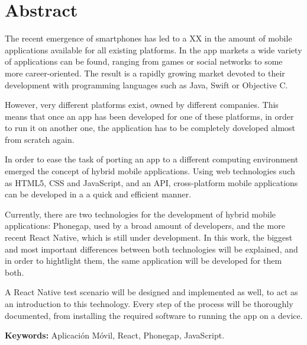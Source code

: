 \chapter*{Abstract}
\justifying


The recent emergence of smartphones has led to a XX in the amount of mobile applications available for all existing platforms. In the app markets a wide variety of applications can be found, ranging from games or social networks to some more career-oriented. The result is a rapidly growing market devoted to their development with programming languages such as Java, Swift or Objective C.

However, very different platforms exist, owned by different companies. This means that once an app has been developed for one of these platforms, in order to run it on another one, the application has to be completely doveloped almost from scratch again.

In order to ease the task of porting an app to a different computing environment emerged the concept of hybrid mobile applications. Using web technologies such as HTML5, CSS and JavaScript, and an API, cross-platform mobile applications can be developed in a a quick and efficient manner.

Currently, there are two technologies for the development of hybrid mobile applications: Phonegap, used by a broad amount of developers, and the more recent React Native, which is still under development. In this work, the biggest and most important differences between both technologies will be explained, and in order to hightlight them, the same application will be developed for them both.

A React Native test scenario will be designed and implemented as well, to act as an introduction to this technology. Every step of the process will be thoroughly documented, from  installing the required software to running the app on a device.

\vspace{5mm}
\large{\textbf{Keywords: } Aplicación Móvil, React, Phonegap, JavaScript.}
\afterpage{\blankpage}